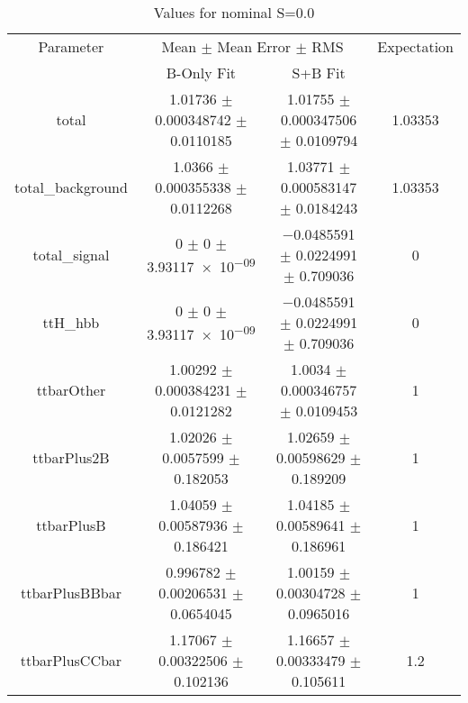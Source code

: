 \begin{table}
\centering
\caption{Values for nominal S=0.0}
\begin{tabular}{cccc}
\toprule
Parameter & \multicolumn{2}{c}{Mean $\pm$ Mean Error $\pm$ RMS} & Expectation\\
 & B-Only Fit & S+B Fit & \\
\midrule
total & \num{1.01736} $\pm$ \num{0.000348742} $\pm$ \num{0.0110185} & \num{1.01755} $\pm$ \num{0.000347506} $\pm$ \num{0.0109794} & \num{1.03353}\\
total\_background & \num{1.0366} $\pm$ \num{0.000355338} $\pm$ \num{0.0112268} & \num{1.03771} $\pm$ \num{0.000583147} $\pm$ \num{0.0184243} & \num{1.03353}\\
total\_signal & \num{0} $\pm$ \num{0} $\pm$ \num{3.93117e-09} & \num{-0.0485591} $\pm$ \num{0.0224991} $\pm$ \num{0.709036} & \num{0}\\
ttH\_hbb & \num{0} $\pm$ \num{0} $\pm$ \num{3.93117e-09} & \num{-0.0485591} $\pm$ \num{0.0224991} $\pm$ \num{0.709036} & \num{0}\\
ttbarOther & \num{1.00292} $\pm$ \num{0.000384231} $\pm$ \num{0.0121282} & \num{1.0034} $\pm$ \num{0.000346757} $\pm$ \num{0.0109453} & \num{1}\\
ttbarPlus2B & \num{1.02026} $\pm$ \num{0.0057599} $\pm$ \num{0.182053} & \num{1.02659} $\pm$ \num{0.00598629} $\pm$ \num{0.189209} & \num{1}\\
ttbarPlusB & \num{1.04059} $\pm$ \num{0.00587936} $\pm$ \num{0.186421} & \num{1.04185} $\pm$ \num{0.00589641} $\pm$ \num{0.186961} & \num{1}\\
ttbarPlusBBbar & \num{0.996782} $\pm$ \num{0.00206531} $\pm$ \num{0.0654045} & \num{1.00159} $\pm$ \num{0.00304728} $\pm$ \num{0.0965016} & \num{1}\\
ttbarPlusCCbar & \num{1.17067} $\pm$ \num{0.00322506} $\pm$ \num{0.102136} & \num{1.16657} $\pm$ \num{0.00333479} $\pm$ \num{0.105611} & \num{1.2}\\
\bottomrule
\end{tabular}
\end{table}